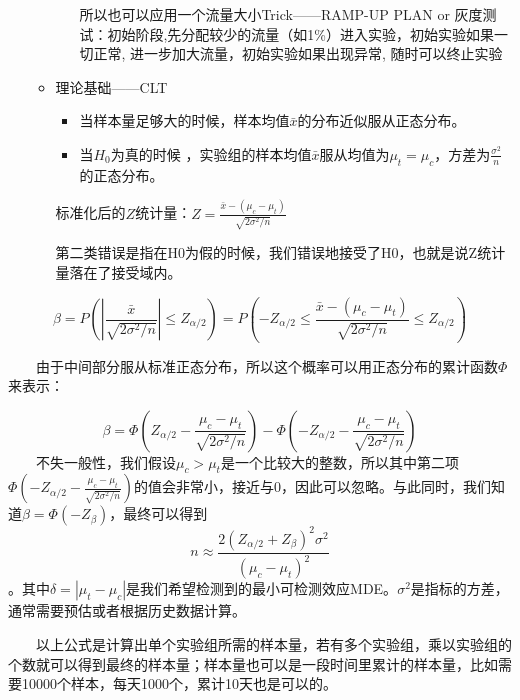 \documentclass[
  letterpaper,
  DIV=11,
  numbers=noendperiod]{scrreprt}
\begin{document}
\begin{itemize}
\begin{itemize}
\begin{itemize}
\begin{tcolorbox}
      所以也可以应用一个流量大小Trick------RAMP-UP PLAN or
      灰度测试：初始阶段,先分配较少的流量（如1\%）进入实验，初始实验如果一切正常,
      进一步加大流量，初始实验如果出现异常, 随时可以终止实验

      \end{tcolorbox}
    \end{itemize}
  \item
    理论基础------CLT

    \begin{itemize}
    \item
      当样本量足够大的时候，样本均值\(\bar{x}\)的分布近似服从正态分布。
    \item
      当\(H_0\)为真的时候
      ，实验组的样本均值\(\bar{x}\)服从均值为\(\mu_t = \mu_c\)，方差为\(\frac{\sigma^2}{n}\)的正态分布。
    \end{itemize}

    标准化后的\(Z\)统计量：\(Z=\frac{\bar{x}-(\mu_c-\mu_t)}{\sqrt{2\sigma^2/n}}\)

    第二类错误是指在H0为假的时候，我们错误地接受了H0，也就是说Z统计量落在了接受域内。
  \end{itemize}
\end{itemize}

\[\beta = P(|\frac{\bar{x}}{\sqrt{2\sigma^2/n}}| \le Z_{\alpha/2}) = P(-Z_{\alpha/2} \le \frac{\bar{x} - (\mu_c - \mu_t)}{\sqrt{2\sigma^2/n}} \le Z_{\alpha/2})\]

  由于中间部分服从标准正态分布，所以这个概率可以用正态分布的累计函数\(\Phi\)来表示：

\[\beta= \Phi(Z_{\alpha/2} - \frac{\mu_c - \mu_t}{\sqrt{2\sigma^2/n}}) - \Phi(-Z_{\alpha/2} - \frac{\mu_c - \mu_t}{\sqrt{2\sigma^2/n}})\]
  不失一般性，我们假设\(\mu_c>\mu_t\)是一个比较大的整数，所以其中第二项\(\Phi(-Z_{\alpha/2} - \frac{\mu_c - \mu_t}{\sqrt{2\sigma^2/n}})\)的值会非常小，接近与0，因此可以忽略。与此同时，我们知道\(\beta = \Phi(-Z_{\beta})\)，最终可以得到\[n \approx \frac{2(Z_{\alpha/2} + Z_\beta)^2 \sigma^2}{(\mu_c - \mu_t)^2}\]。其中\(\delta = |\mu_t-\mu_c|\)是我们希望检测到的最小可检测效应MDE。\(\sigma^2\)是指标的方差，通常需要预估或者根据历史数据计算。

  以上公式是计算出单个实验组所需的样本量，若有多个实验组，乘以实验组的个数就可以得到最终的样本量；样本量也可以是一段时间里累计的样本量，比如需要10000个样本，每天1000个，累计10天也是可以的。
\end{document}
